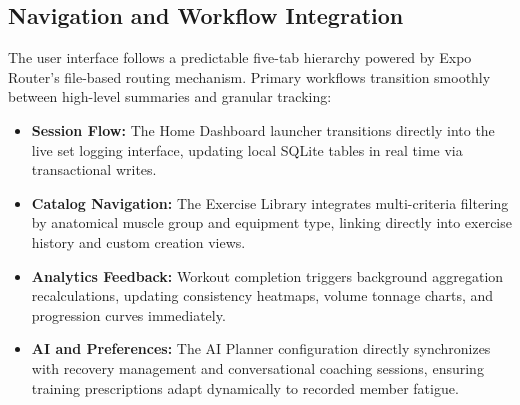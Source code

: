 \subsection{Navigation and Workflow Integration}
The user interface follows a predictable five-tab hierarchy powered by Expo Router's file-based routing mechanism. Primary workflows transition smoothly between high-level summaries and granular tracking:
\begin{itemize}
    \item \textbf{Session Flow:} The Home Dashboard launcher transitions directly into the live set logging interface, updating local SQLite tables in real time via transactional writes.
    \item \textbf{Catalog Navigation:} The Exercise Library integrates multi-criteria filtering by anatomical muscle group and equipment type, linking directly into exercise history and custom creation views.
    \item \textbf{Analytics Feedback:} Workout completion triggers background aggregation recalculations, updating consistency heatmaps, volume tonnage charts, and progression curves immediately.
    \item \textbf{AI and Preferences:} The AI Planner configuration directly synchronizes with recovery management and conversational coaching sessions, ensuring training prescriptions adapt dynamically to recorded member fatigue.
\end{itemize}
